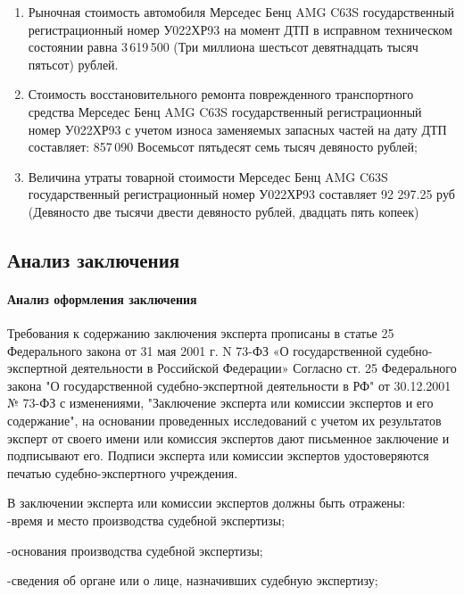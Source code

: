 \begin{enumerate}
	\item Рыночная стоимость автомобиля Мерседес Бенц AMG C63S государственный регистрационный номер У022ХР93 на момент ДТП в исправном техническом состоянии равна  3\,619\,500  (Три миллиона шестьсот девятнадцать тысяч пятьсот) рублей.
	\item Стоимость восстановительного ремонта поврежденного транспортного средства Мерседес Бенц AMG C63S государственный регистрационный номер У022ХР93 с учетом износа заменяемых запасных частей на дату ДТП составляет: 857\,090  Восемьсот пятьдесят семь тысяч девяносто рублей;
	\item Величина утраты товарной стоимости Мерседес Бенц AMG C63S государственный регистрационный номер У022ХР93 составляет 92 297.25 руб (Девяносто две тысячи двести девяносто рублей,  двадцать пять копеек)
\end{enumerate}


\subsection{ Анализ заключения}

\paragraph{ Анализ оформления заключения }


\par Требования к содержанию заключения эксперта прописаны в статье 25 Федерального закона от 31 мая 2001 г. N 73-ФЗ «О государственной судебно-экспертной деятельности в Российской Федерации»
Согласно ст. 25 Федерального закона "О государственной судебно-экспертной деятельности в РФ" от 30.12.2001 № 73-ФЗ с изменениями, "Заключение эксперта или комиссии экспертов и его содержание", на основании проведенных исследований с учетом их результатов эксперт от своего имени или комиссия экспертов дают письменное заключение и подписывают его. Подписи эксперта или комиссии экспертов удостоверяются печатью судебно-экспертного учреждения.

\noindent В заключении эксперта или комиссии экспертов должны быть отражены:\\
 -время и место производства судебной экспертизы;

\noindent -основания производства судебной экспертизы;

\noindent -сведения об органе или о лице, назначивших судебную экспертизу;

